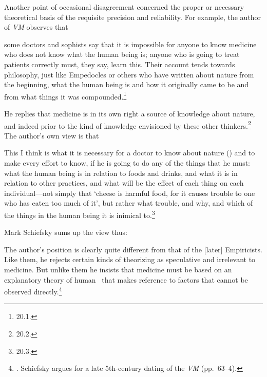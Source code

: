 \documentclass[11pt,letterpaper,oneside]{amsart} %
\begin{document}
Another point of occasional disagreement concerned the proper or necessary theoretical basis of the requisite precision and reliability. For example, the author of \emph{VM} observes that\begin{squote}[GREEK]

\vspace{0.05in}

\noindent some doctors and sophists say that it is impossible for anyone to know medicine who does not know what the human being is; anyone who is going to treat patients correctly must, they say, learn this. Their account tends towards philosophy, just like Empedocles or others who have written about nature from the beginning, what the human being is and how it originally came to be and from what things it was compounded.\footnote{ 20.1.}\end{squote}He replies that medicine is in its own right a source of knowledge about nature, and indeed prior to the kind of knowledge envisioned by these other thinkers.\footnote{ 20.2.} The author's own view is that\begin{squote}[GREEK]

\vspace{0.05in}

\noindent This I think is what it is necessary for a doctor to know about nature (\phusis) and to make every effort to know, if he is going to do any of the things that he must: what the human being is in relation to foods and drinks, and what it is in relation to other practices, and what will be the effect of each thing on each individual---not simply that `cheese is harmful food, for it causes trouble to one who has eaten too much of it', but rather what trouble, and why, and which of the things in the human being it is inimical to.\footnote{ 20.3.}\end{squote}Mark Schiefsky sums up the view thus:\begin{squote}The author’s position is clearly quite different from that of the [later] Empiricists. Like them, he rejects certain kinds of theorizing as speculative and irrelevant to medicine. But unlike them he insists that medicine must be based on an explanatory theory of human \phusis\ that makes reference to factors that cannot be observed directly.\footnote{\citet[p.\ 357]{schiefsky2005}. Schiefsky argues for a late 5th-century dating of the \emph{VM} (pp.\ 63--4).}\end{squote}
\end{document}
